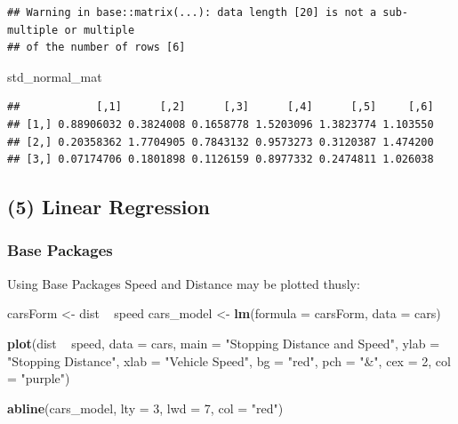 \documentclass[]{article}
\newenvironment{Shaded}{}{}
\newcommand{\DataTypeTok}[1]{\textcolor[rgb]{0.56,0.13,0.00}{#1}}
\newcommand{\DecValTok}[1]{\textcolor[rgb]{0.25,0.63,0.44}{#1}}
\newcommand{\KeywordTok}[1]{\textcolor[rgb]{0.00,0.44,0.13}{\textbf{#1}}}
\newcommand{\NormalTok}[1]{#1}
\newcommand{\OperatorTok}[1]{\textcolor[rgb]{0.40,0.40,0.40}{#1}}
\newcommand{\StringTok}[1]{\textcolor[rgb]{0.25,0.44,0.63}{#1}}
\begin{document}
\begin{verbatim}
## Warning in base::matrix(...): data length [20] is not a sub-multiple or multiple
## of the number of rows [6]
\end{verbatim}

\begin{Shaded}
\begin{Highlighting}[]
\NormalTok{std_normal_mat}
\end{Highlighting}
\end{Shaded}

\begin{verbatim}
##            [,1]      [,2]      [,3]      [,4]      [,5]     [,6]
## [1,] 0.88906032 0.3824008 0.1658778 1.5203096 1.3823774 1.103550
## [2,] 0.20358362 1.7704905 0.7843132 0.9573273 0.3120387 1.474200
## [3,] 0.07174706 0.1801898 0.1126159 0.8977332 0.2474811 1.026038
\end{verbatim}

\hypertarget{linear-regression}{%
\subsection{(5) Linear Regression}\label{linear-regression}}

\hypertarget{base-packages}{%
\subsubsection{Base Packages}\label{base-packages}}

Using Base Packages Speed and Distance may be plotted thusly:

\begin{Shaded}
\begin{Highlighting}[]
\NormalTok{carsForm <-}\StringTok{ }\NormalTok{dist }\OperatorTok{~}\StringTok{ }\NormalTok{speed}
\NormalTok{cars_model <-}\StringTok{ }\KeywordTok{lm}\NormalTok{(}\DataTypeTok{formula =}\NormalTok{ carsForm, }\DataTypeTok{data =}\NormalTok{ cars)}

\KeywordTok{plot}\NormalTok{(dist }\OperatorTok{~}\StringTok{ }\NormalTok{speed, }\DataTypeTok{data =}\NormalTok{ cars,}
     \DataTypeTok{main =} \StringTok{"Stopping Distance and Speed"}\NormalTok{,}
     \DataTypeTok{ylab =} \StringTok{"Stopping Distance"}\NormalTok{,}
     \DataTypeTok{xlab =} \StringTok{"Vehicle Speed"}\NormalTok{,}
     \DataTypeTok{bg =} \StringTok{"red"}\NormalTok{,}
     \DataTypeTok{pch =} \StringTok{"&"}\NormalTok{, }\DataTypeTok{cex =} \DecValTok{2}\NormalTok{,}
     \DataTypeTok{col =} \StringTok{"purple"}\NormalTok{)}

\KeywordTok{abline}\NormalTok{(cars_model, }\DataTypeTok{lty =} \DecValTok{3}\NormalTok{, }\DataTypeTok{lwd =} \DecValTok{7}\NormalTok{, }\DataTypeTok{col =} \StringTok{"red"}\NormalTok{)}
\end{Highlighting}
\end{Shaded}
\end{document}
